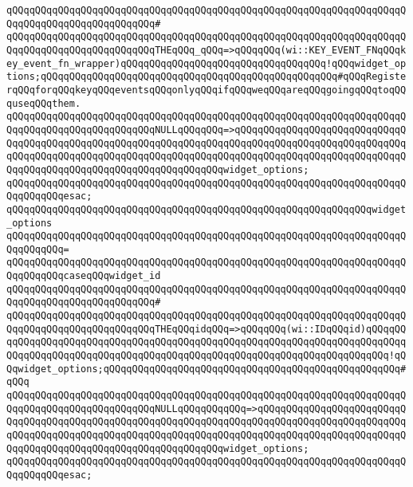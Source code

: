 \verb|qQQqqQQqqQQqqQQqqQQqqQQqqQQqqQQqqQQqqQQqqQQqqQQqqQQqqQQqqQQqqQQqqQQqqQQqqQQqqQQqqQQqqQQqqQQqqQQq#|\newline
\verb|qQQqqQQqqQQqqQQqqQQqqQQqqQQqqQQqqQQqqQQqqQQqqQQqqQQqqQQqqQQqqQQqqQQqqQQqqQQqqQQqqQQqqQQqqQQqqQQqTHEqQQq_qQQq=>qQQqqQQq(wi::KEY_EVENT_FNqQQqkey_event_fn_wrapper)qQQqqQQqqQQqqQQqqQQqqQQqqQQqqQQqqQQq!qQQqwidget_options;qQQqqQQqqQQqqQQqqQQqqQQqqQQqqQQqqQQqqQQqqQQqqQQqqQQq#qQQqRegisterqQQqforqQQqkeyqQQqeventsqQQqonlyqQQqifqQQqweqQQqareqQQqgoingqQQqtoqQQquseqQQqthem.|\newline
\verb|qQQqqQQqqQQqqQQqqQQqqQQqqQQqqQQqqQQqqQQqqQQqqQQqqQQqqQQqqQQqqQQqqQQqqQQqqQQqqQQqqQQqqQQqqQQqqQQqNULLqQQqqQQq=>qQQqqQQqqQQqqQQqqQQqqQQqqQQqqQQqqQQqqQQqqQQqqQQqqQQqqQQqqQQqqQQqqQQqqQQqqQQqqQQqqQQqqQQqqQQqqQQqqQQqqQQqqQQqqQQqqQQqqQQqqQQqqQQqqQQqqQQqqQQqqQQqqQQqqQQqqQQqqQQqqQQqqQQqqQQqqQQqqQQqqQQqqQQqqQQqqQQqqQQqqQQqqQQqwidget_options;|\newline
\verb|qQQqqQQqqQQqqQQqqQQqqQQqqQQqqQQqqQQqqQQqqQQqqQQqqQQqqQQqqQQqqQQqqQQqqQQqqQQqqQQqesac;|\newline
\newline
\verb|qQQqqQQqqQQqqQQqqQQqqQQqqQQqqQQqqQQqqQQqqQQqqQQqqQQqqQQqqQQqqQQqwidget_options|\newline
\verb|qQQqqQQqqQQqqQQqqQQqqQQqqQQqqQQqqQQqqQQqqQQqqQQqqQQqqQQqqQQqqQQqqQQqqQQqqQQqqQQq=|\newline
\verb|qQQqqQQqqQQqqQQqqQQqqQQqqQQqqQQqqQQqqQQqqQQqqQQqqQQqqQQqqQQqqQQqqQQqqQQqqQQqqQQqcaseqQQqwidget_id|\newline
\verb|qQQqqQQqqQQqqQQqqQQqqQQqqQQqqQQqqQQqqQQqqQQqqQQqqQQqqQQqqQQqqQQqqQQqqQQqqQQqqQQqqQQqqQQqqQQqqQQq#|\newline
\verb|qQQqqQQqqQQqqQQqqQQqqQQqqQQqqQQqqQQqqQQqqQQqqQQqqQQqqQQqqQQqqQQqqQQqqQQqqQQqqQQqqQQqqQQqqQQqqQQqTHEqQQqidqQQq=>qQQqqQQq(wi::IDqQQqid)qQQqqQQqqQQqqQQqqQQqqQQqqQQqqQQqqQQqqQQqqQQqqQQqqQQqqQQqqQQqqQQqqQQqqQQqqQQqqQQqqQQqqQQqqQQqqQQqqQQqqQQqqQQqqQQqqQQqqQQqqQQqqQQqqQQqqQQqqQQqqQQq!qQQqwidget_options;qQQqqQQqqQQqqQQqqQQqqQQqqQQqqQQqqQQqqQQqqQQqqQQqqQQq#qQQq|\newline
\verb|qQQqqQQqqQQqqQQqqQQqqQQqqQQqqQQqqQQqqQQqqQQqqQQqqQQqqQQqqQQqqQQqqQQqqQQqqQQqqQQqqQQqqQQqqQQqqQQqNULLqQQqqQQqqQQq=>qQQqqQQqqQQqqQQqqQQqqQQqqQQqqQQqqQQqqQQqqQQqqQQqqQQqqQQqqQQqqQQqqQQqqQQqqQQqqQQqqQQqqQQqqQQqqQQqqQQqqQQqqQQqqQQqqQQqqQQqqQQqqQQqqQQqqQQqqQQqqQQqqQQqqQQqqQQqqQQqqQQqqQQqqQQqqQQqqQQqqQQqqQQqqQQqqQQqqQQqqQQqwidget_options;|\newline
\verb|qQQqqQQqqQQqqQQqqQQqqQQqqQQqqQQqqQQqqQQqqQQqqQQqqQQqqQQqqQQqqQQqqQQqqQQqqQQqqQQqesac;|\newline
